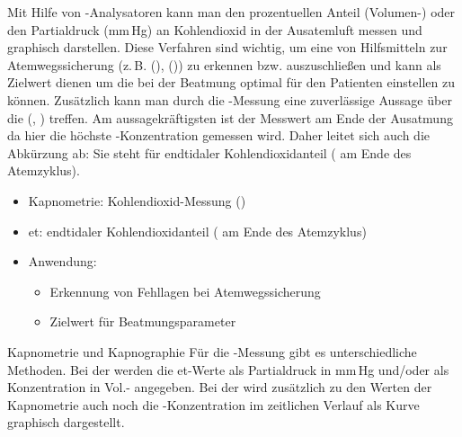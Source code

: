 \TextSlide
{\TxBeschreibung}%
{%
%
Mit Hilfe von -Analysatoren 
kann man den prozentuellen Anteil (Volumen-\PC) 
oder den Partialdruck (mm\,Hg) an Kohlendioxid 
in der Ausatemluft messen 
und graphisch darstellen. 
%
Diese Verfahren sind wichtig, 
um eine  
von Hilfsmitteln zur Atemwegssicherung 
(z.\,B.  (), 
 ())
zu erkennen 
bzw. auszuschließen 
und kann als Zielwert dienen um die  
bei der Beatmung
optimal für den Patienten einstellen zu können. 
%
Zusätzlich kann man durch die -Messung eine zuverlässige Aussage 
über die  
(, ) 
treffen.
%
%
%
Am aussagekräftigsten ist der Messwert am Ende der Ausatmung 
da hier die höchste -Konzentration gemessen wird. 
%
Daher leitet sich auch die Abkürzung  ab:
%
Sie steht für endtidaler Kohlendioxidanteil 
( am Ende des Atemzyklus).

}%
{%
\begin{itemize}
  \item Kapnometrie: Kohlendioxid-Messung ()
  \item et: endtidaler Kohlendioxidanteil 
  ( am Ende des Atemzyklus)
  \item Anwendung:
  \begin{itemize}
    \item Erkennung von Fehllagen bei Atemwegssicherung
    \item Zielwert für Beatmungsparameter
  \end{itemize}
\end{itemize}
}


\Text
{Kapnometrie und Kapnographie}%
{%
Für die -Messung gibt es unterschiedliche Methoden.
%
Bei der  werden die et-Werte als Partialdruck in mm\,Hg und/oder als Konzentration in Vol.-{\PC} angegeben.
%
Bei der  wird 
zusätzlich zu den Werten der Kapnometrie 
auch noch die -Konzentration im zeitlichen Verlauf 
als Kurve graphisch dargestellt.
}%

